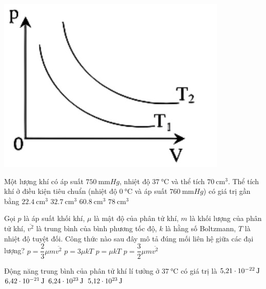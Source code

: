 \begin{ex}
{\vspace{-0.5cm}	\includegraphics[scale=0.4]{../figs/FINAL-SEM1-002-3}}
	\loigiai{}
\end{ex}
\begin{ex}
	Một lượng khí có áp suất $\SI{750}{\milli\meter Hg}$, nhiệt độ $\SI{37}{\celsius}$ và thể tích $\SI{70}{\centi\meter^3}$. Thể tích khí ở điều kiện tiêu chuẩn (nhiệt độ $\SI{0}{\celsius}$ và áp suất $\SI{760}{\milli\meter Hg}$) có giá trị gần bằng
	\choice
	{$\SI{22.4}{\centi\meter^3}$}
	{$\SI{32.7}{\centi\meter^3}$}
	{$\SI{60.8}{\centi\meter^3}$}
	{$\SI{78}{\centi\meter^3}$}
	\loigiai{}
\end{ex}
\begin{ex}
Gọi $p$ là áp suất khối khí, $\mu$ là mật độ của phân tử khí, $m$ là khối lượng của phân tử khí, $\overline{v^2}$ là trung bình của bình phương tốc độ, $k$ là hằng số Boltzmann, $T$ là nhiệt độ tuyệt đối. Công thức nào sau đây mô tả đúng mối liên hệ giữa các đại lượng?	
	\choice
	{$p=\dfrac{2}{3}\mu m\overline{v^2}$}
	{$p=3\mu kT$}
	{$p=\mu kT$}
	{$p=\dfrac{3}{2}\mu m\overline{v^2}$}
	\loigiai{}
\end{ex}
\begin{ex}
Động năng trung bình của phân tử khí lí tưởng ở $\SI{37}{\celsius}$ có giá trị là	
	\choice
	{$\SI{5.21E-22}{\joule}$}
	{$\SI{6.42E-21}{\joule}$}
	{$\SI{6.24E23}{\joule}$}
	{$\SI{5.12E23}{\joule}$}
	\loigiai{}
\end{ex}
